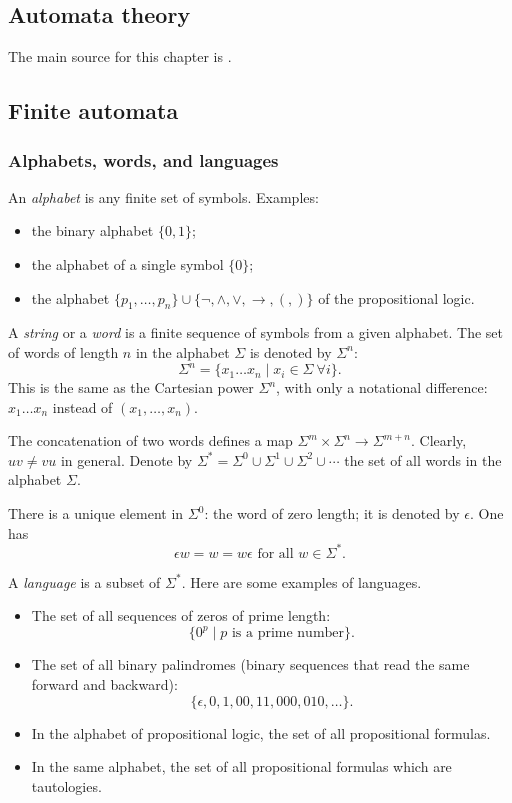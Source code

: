 \begin{page}

\chapter{Automata theory}
The main source for this chapter is \cite{HU79}.
\section{Finite automata}
\subsection{Alphabets, words, and languages}
An \emph{alphabet} is any finite set of symbols.
Examples:
\begin{itemize}
\item
the binary alphabet $\{0,1\}$;
\item
the alphabet of a single symbol $\{0\}$;
\item
the alphabet $\{p_1, \ldots, p_n\} \cup \{\neg, \wedge, \vee, \to, (, )\}$ of the propositional logic.
\end{itemize}

A \emph{string} or a \emph{word} is a finite sequence of symbols from a given alphabet.
The set of words of length $n$ in the alphabet $\Sigma$ is denoted by $\Sigma^n$:
\[
\Sigma^n = \{x_1 \ldots x_n \mid x_i \in \Sigma\ \forall i\}.
\]
This is the same as the Cartesian power $\Sigma^n$, with only a notational difference: $x_1 \ldots x_n$
instead of $(x_1, \ldots, x_n)$.

The concatenation of two words defines a map $\Sigma^m \times \Sigma^n \to \Sigma^{m+n}$.
Clearly, $uv \ne vu$ in general.
Denote by $\Sigma^* = \Sigma^0 \cup \Sigma^1 \cup \Sigma^2 \cup \cdots$ the set of all words in the alphabet $\Sigma$.

There is a unique element in $\Sigma^0$: the word of zero length; it is denoted by $\epsilon$.
One has
\[
\epsilon w = w = w\epsilon \text{ for all } w \in \Sigma^*.
\]

A \emph{language} is a subset of $\Sigma^*$.
Here are some examples of languages.

\begin{itemize}
\item
The set of all sequences of zeros of prime length:
\[
\{0^p \mid p \text{ is a prime number}\}.
\]
\item
The set of all binary palindromes (binary sequences that read the same forward and backward):
\[
\{\epsilon, 0, 1, 00, 11, 000, 010, \ldots\}.
\]
\item
In the alphabet of propositional logic, the set of all propositional formulas.
\item
In the same alphabet, the set of all propositional formulas which are tautologies.
\end{itemize}






\end{page}
